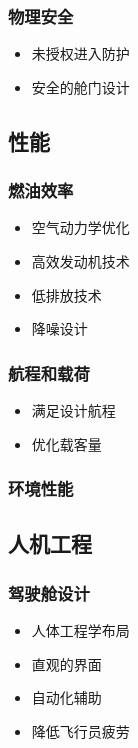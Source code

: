 \begin{multicols}{2}
  \subsubsection{物理安全}
  
  \begin{itemize}
      \item 未授权进入防护
      \item 安全的舱门设计
  \end{itemize}
  
  \subsection{性能}
  
  \subsubsection{燃油效率}
  
  \begin{itemize}
      \item 空气动力学优化
      \item 高效发动机技术
      \item 低排放技术
      \item 降噪设计
  \end{itemize}
  
  \subsubsection{航程和载荷}
  
  \begin{itemize}
      \item 满足设计航程
      \item 优化载客量
  \end{itemize}
  
  \subsubsection{环境性能}
  
  \subsection{人机工程}
  
  \subsubsection{驾驶舱设计}
  
  \begin{itemize}
      \item 人体工程学布局
      \item 直观的界面
      \item 自动化辅助
      \item 降低飞行员疲劳
  \end{itemize}
  

\end{multicols}
